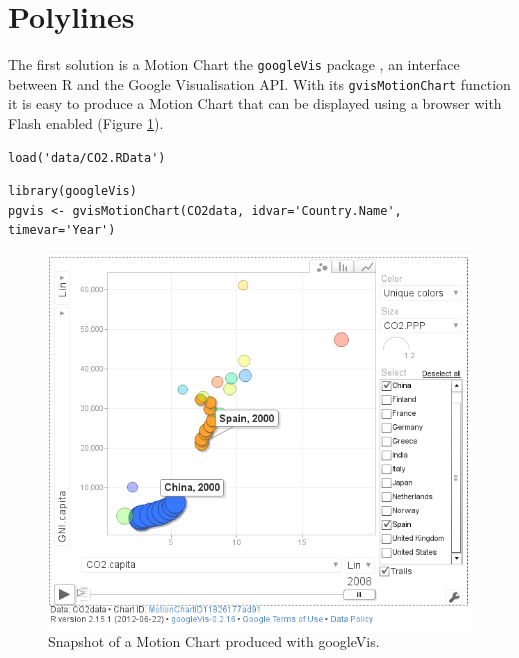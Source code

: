 
\section{Polylines}
\label{sec-1}
The first solution is a Motion Chart the \texttt{googleVis} package
\cite{Gesmann.deCastillo2011}, an interface between R and the Google
Visualisation API. With its \texttt{gvisMotionChart} function it is easy to
produce a Motion Chart that can be displayed using a browser with
Flash enabled (Figure \ref{fig:googleVis}).

\lstset{language=R,numbers=none}
\begin{lstlisting}
load('data/CO2.RData')
\end{lstlisting}




\lstset{language=R,numbers=none}
\begin{lstlisting}
library(googleVis)
pgvis <- gvisMotionChart(CO2data, idvar='Country.Name', timevar='Year')
\end{lstlisting}

\begin{figure}
  \centering
  \includegraphics[width=\textwidth]{figs/googleVis}
  \caption{Snapshot of a Motion Chart produced with googleVis.}
  \label{fig:googleVis}
\end{figure}



